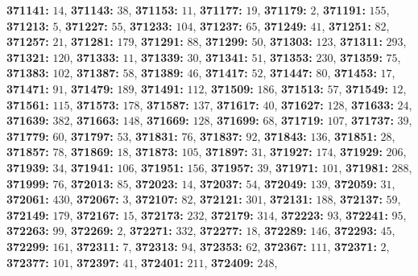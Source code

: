 \textsf{\bfseries 371141:} $14$, \textsf{\bfseries 371143:} $38$, \textsf{\bfseries 371153:} $11$, \textsf{\bfseries 371177:} $19$, \textsf{\bfseries 371179:} $2$, \textsf{\bfseries 371191:} $155$, \textsf{\bfseries 371213:} $5$, \textsf{\bfseries 371227:} $55$, \textsf{\bfseries 371233:} $104$, \textsf{\bfseries 371237:} $65$, \textsf{\bfseries 371249:} $41$, \textsf{\bfseries 371251:} $82$, \textsf{\bfseries 371257:} $21$, \textsf{\bfseries 371281:} $179$, \textsf{\bfseries 371291:} $88$, \textsf{\bfseries 371299:} $50$, \textsf{\bfseries 371303:} $123$, \textsf{\bfseries 371311:} $293$, \textsf{\bfseries 371321:} $120$, \textsf{\bfseries 371333:} $11$, \textsf{\bfseries 371339:} $30$, \textsf{\bfseries 371341:} $51$, \textsf{\bfseries 371353:} $230$, \textsf{\bfseries 371359:} $75$, \textsf{\bfseries 371383:} $102$, \textsf{\bfseries 371387:} $58$, \textsf{\bfseries 371389:} $46$, \textsf{\bfseries 371417:} $52$, \textsf{\bfseries 371447:} $80$, \textsf{\bfseries 371453:} $17$, \textsf{\bfseries 371471:} $91$, \textsf{\bfseries 371479:} $189$, \textsf{\bfseries 371491:} $112$, \textsf{\bfseries 371509:} $186$, \textsf{\bfseries 371513:} $57$, \textsf{\bfseries 371549:} $12$, \textsf{\bfseries 371561:} $115$, \textsf{\bfseries 371573:} $178$, \textsf{\bfseries 371587:} $137$, \textsf{\bfseries 371617:} $40$, \textsf{\bfseries 371627:} $128$, \textsf{\bfseries 371633:} $24$, \textsf{\bfseries 371639:} $382$, \textsf{\bfseries 371663:} $148$, \textsf{\bfseries 371669:} $128$, \textsf{\bfseries 371699:} $68$, \textsf{\bfseries 371719:} $107$, \textsf{\bfseries 371737:} $39$, \textsf{\bfseries 371779:} $60$, \textsf{\bfseries 371797:} $53$, \textsf{\bfseries 371831:} $76$, \textsf{\bfseries 371837:} $92$, \textsf{\bfseries 371843:} $136$, \textsf{\bfseries 371851:} $28$, \textsf{\bfseries 371857:} $78$, \textsf{\bfseries 371869:} $18$, \textsf{\bfseries 371873:} $105$, \textsf{\bfseries 371897:} $31$, \textsf{\bfseries 371927:} $174$, \textsf{\bfseries 371929:} $206$, \textsf{\bfseries 371939:} $34$, \textsf{\bfseries 371941:} $106$, \textsf{\bfseries 371951:} $156$, \textsf{\bfseries 371957:} $39$, \textsf{\bfseries 371971:} $101$, \textsf{\bfseries 371981:} $288$, \textsf{\bfseries 371999:} $76$, \textsf{\bfseries 372013:} $85$, \textsf{\bfseries 372023:} $14$, \textsf{\bfseries 372037:} $54$, \textsf{\bfseries 372049:} $139$, \textsf{\bfseries 372059:} $31$, \textsf{\bfseries 372061:} $430$, \textsf{\bfseries 372067:} $3$, \textsf{\bfseries 372107:} $82$, \textsf{\bfseries 372121:} $301$, \textsf{\bfseries 372131:} $188$, \textsf{\bfseries 372137:} $59$, \textsf{\bfseries 372149:} $179$, \textsf{\bfseries 372167:} $15$, \textsf{\bfseries 372173:} $232$, \textsf{\bfseries 372179:} $314$, \textsf{\bfseries 372223:} $93$, \textsf{\bfseries 372241:} $95$, \textsf{\bfseries 372263:} $99$, \textsf{\bfseries 372269:} $2$, \textsf{\bfseries 372271:} $332$, \textsf{\bfseries 372277:} $18$, \textsf{\bfseries 372289:} $146$, \textsf{\bfseries 372293:} $45$, \textsf{\bfseries 372299:} $161$, \textsf{\bfseries 372311:} $7$, \textsf{\bfseries 372313:} $94$, \textsf{\bfseries 372353:} $62$, \textsf{\bfseries 372367:} $111$, \textsf{\bfseries 372371:} $2$, \textsf{\bfseries 372377:} $101$, \textsf{\bfseries 372397:} $41$, \textsf{\bfseries 372401:} $211$, \textsf{\bfseries 372409:} $248$, 
